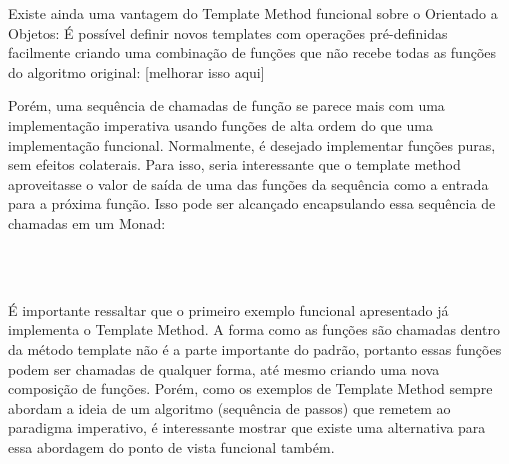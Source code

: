 Existe ainda uma vantagem do Template Method funcional sobre o Orientado a 
Objetos: É possível definir novos templates com operações pré-definidas 
facilmente criando uma combinação de funções que não recebe todas as 
funções do algoritmo original: [melhorar isso aqui]

Porém, uma sequência de chamadas de função se parece mais com uma 
implementação imperativa usando funções de alta ordem do que uma implementação 
funcional. Normalmente, é desejado implementar funções puras, sem efeitos 
colaterais. Para isso, seria interessante que o template method aproveitasse 
o valor de saída de uma das funções da sequência como a entrada para a 
próxima função. Isso pode ser alcançado encapsulando essa sequência de 
chamadas em um Monad:

\begin{lstlisting}[caption={Template Method Funcional: Monads},label=fptpmethodmonads]
    
    

\end{lstlisting}

É importante ressaltar que o primeiro exemplo funcional apresentado 
já implementa o Template Method. A forma como as funções são chamadas 
dentro da método template não é a parte importante do padrão, portanto 
essas funções podem ser chamadas de qualquer forma, até mesmo criando 
uma nova composição de funções. Porém, como os exemplos de Template 
Method sempre abordam a ideia de um algoritmo (sequência de passos) que 
remetem ao paradigma imperativo, é interessante mostrar que existe uma 
alternativa para essa abordagem do ponto de vista funcional também.